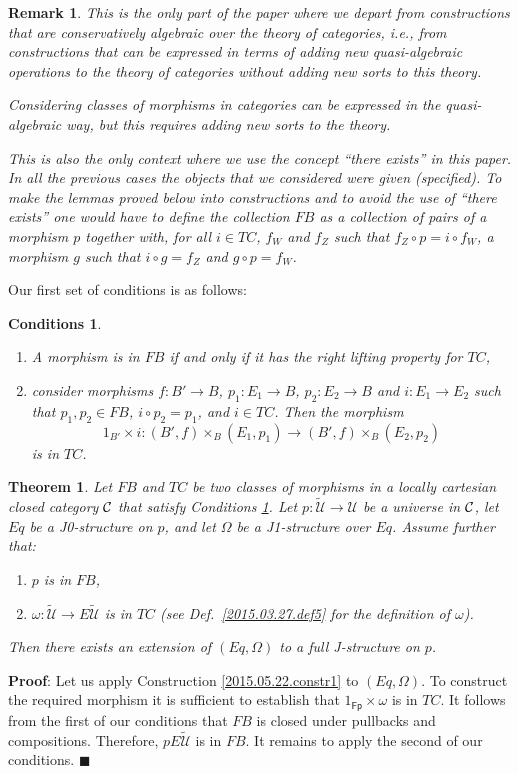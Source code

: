 \documentclass[12pt]{article}
\numberwithin{equation}{section}
\newenvironment{myproof}{{\bf Proof}:}{$\blacksquare$ \vskip 5mm }
\newtheorem{theorem}[proposition]{Theorem}
\newtheorem{remark}[proposition]{Remark}
\newtheorem{cond}[proposition]{Conditions}
\newcommand{\sr}{\rightarrow}
\newcommand{\wt}{\widetilde}
\newcommand{\id}{1}            %
\newcommand{\U}{\mathcal{U}}
\newcommand{\Fp}{\mathsf{Fp}}
\begin{document}
\begin{remark}\rm
  This is the only part of the paper where we depart from constructions that are
conservatively algebraic over the theory of categories, i.e., from
constructions that can be expressed in terms of adding new quasi-algebraic
operations to the theory of categories without adding new sorts to this theory.

Considering classes of morphisms in categories can be expressed in the
quasi-algebraic way, but this requires adding new sorts to the theory.

This is also the only context where we use the concept ``there exists'' in this
paper. In all the previous cases the objects that we considered were given
(specified). To make the lemmas proved below into constructions and to avoid
the use of ``there exists'' one would have to define the collection $FB$ as a
collection of pairs of a morphism $p$ together with, for all $i\in TC$, $f_W$
and $f_Z$ such that $f_Z\circ p=i\circ f_W$, a morphism $g$ such that $i\circ
g=f_Z$ and $g\circ p=f_W$.

\end{remark}


Our first set of conditions is as follows:
%
\begin{cond}\label{2015.05.22.cond2}
\begin{enumerate}
\item A morphism is in $FB$ if and only if it has the right lifting property
  for $TC$,
\item consider morphisms $f: B'\sr B$, $p_1:E_1\sr B$, $p_2:E_2\sr B$ and
  $i:E_1\sr E_2$ such that $p_1,p_2\in FB$, $i \circ p_2 = p_1$, and $i\in TC$. Then the morphism
%
$$\id_{B'}\times i: (B',f)\times_B(E_1,p_1)\sr (B',f)\times_B(E_2,p_2)$$
%
is in $TC$.
\end{enumerate}
\end{cond}
%
\begin{theorem}
\label{2015.05.22.th1} Let $FB$ and $TC$ be two classes of morphisms in a
locally cartesian closed category $\cal C$ that satisfy Conditions
\ref{2015.05.22.cond2}. Let $p:\wt{\U}\sr \U$ be a universe in $\cal C$, let 
$Eq$ be a J0-structure on $p$, and let $\Omega$ be a J1-structure over $Eq$.
Assume further that:
%
\begin{enumerate}
\item $p$ is in $FB$,
\item $\omega : \wt{\U}\sr E\wt{\U}$ is in $TC$ (see Def.~\ref{2015.03.27.def5} for the definition of $\omega$).
\end{enumerate}
%
Then there exists an extension of $(Eq,\Omega)$ to a full J-structure on $p$.
\end{theorem}
%
\begin{myproof}
Let us apply Construction \ref{2015.05.22.constr1} to $(Eq,\Omega)$. To
construct the required morphism it is sufficient to establish that
$\id_{\Fp}\times\omega$ is in $TC$. It follows from the first of our conditions
that $FB$ is closed under pullbacks and compositions. Therefore, $pE\wt{\U}$ is
in $FB$. It remains to apply the second of our conditions.
\end{myproof}
% 
\end{document}
